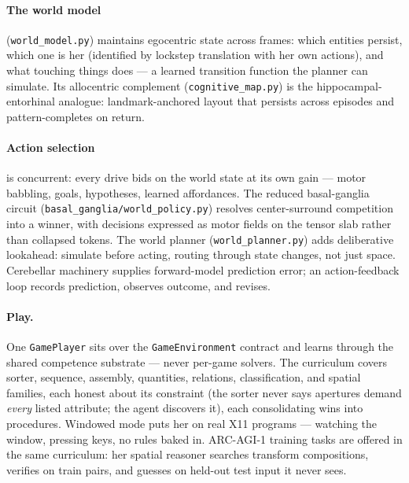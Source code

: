 \documentclass[11pt]{article}
\newcommand{\code}[1]{\texttt{\small #1}}
\begin{document}
\paragraph{The world model} (\code{world\_model.py}) maintains
egocentric state across frames: which entities persist, which one is
her (identified by lockstep translation with her own actions), and what
touching things does --- a learned transition function the planner can
simulate. Its allocentric complement (\code{cognitive\_map.py}) is the
hippocampal-entorhinal analogue: landmark-anchored layout that persists
across episodes and pattern-completes on return.

\paragraph{Action selection} is concurrent: every drive bids on the
world state at its own gain --- motor babbling, goals, hypotheses,
learned affordances. The reduced basal-ganglia circuit
(\code{basal\_ganglia/world\_policy.py}) resolves center-surround
competition into a winner, with decisions expressed as motor fields on
the tensor slab
rather than collapsed tokens. The world planner
(\code{world\_planner.py}) adds deliberative lookahead: simulate before
acting, routing through state changes, not just space. Cerebellar
machinery supplies forward-model prediction error; an action-feedback
loop records prediction, observes outcome, and revises.

\paragraph{Play.} One \code{GamePlayer} sits over the
\code{GameEnvironment} contract and learns through the shared
competence substrate --- never per-game solvers. The curriculum covers
sorter, sequence, assembly, quantities, relations, classification, and
spatial families, each honest about its constraint (the sorter never
says apertures demand \emph{every} listed attribute; the agent
discovers it), each consolidating wins into procedures. Windowed mode
puts her on real X11 programs --- watching the window, pressing keys,
no rules baked in. ARC-AGI-1 training tasks are offered in the same
curriculum: her spatial reasoner searches transform compositions,
verifies on train pairs, and guesses on held-out test input it never
sees.
\end{document}
